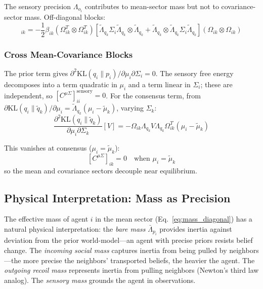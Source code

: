 \documentclass[11pt]{article}
\begin{document}
The sensory precision $\Lambda_{o_i}$ contributes to mean-sector mass but not to covariance-sector mass. Off-diagonal blocks:
\begin{equation}
[M_{\Sigma\Sigma}]_{ik} = -\frac{1}{2}\beta_{ik}(\Omega_{ik}^T \otimes \Omega_{ik}^T)\left[\tilde{\Lambda}_{q_k}\Sigma_i\tilde{\Lambda}_{q_k} \otimes \tilde{\Lambda}_{q_k} + \tilde{\Lambda}_{q_k} \otimes \tilde{\Lambda}_{q_k}\Sigma_i\tilde{\Lambda}_{q_k}\right](\Omega_{ik} \otimes \Omega_{ik})
\end{equation}

\subsubsection{Cross Mean-Covariance Blocks}

The prior term gives $\partial^2 \mathrm{KL}(q_i \| p_i)/\partial \mu_i \partial \Sigma_i = 0$. The sensory free energy decomposes into a term quadratic in $\mu_i$ and a term linear in $\Sigma_i$; these are independent, so $[C^{\mu\Sigma}]_{ii}^{\text{sensory}} = 0$. For the consensus term, from $\partial \mathrm{KL}(q_i \| \tilde{q}_k)/\partial \mu_i = \tilde{\Lambda}_{q_k}(\mu_i - \tilde{\mu}_k)$, varying $\Sigma_k$:
\begin{equation}
\frac{\partial^2 \mathrm{KL}(q_i \| \tilde{q}_k)}{\partial \mu_i \partial \Sigma_k}[V] = -\Omega_{ik}\Lambda_{q_k} V \Lambda_{q_k} \Omega_{ik}^T (\mu_i - \tilde{\mu}_k)
\end{equation}

This vanishes at consensus ($\mu_i = \tilde{\mu}_k$):
\begin{equation}
\boxed{[C^{\mu\Sigma}]_{ik} = 0 \quad \text{when } \mu_i = \tilde{\mu}_k}
\end{equation}
so the mean and covariance sectors decouple near equilibrium.

\subsection{Physical Interpretation: Mass as Precision}

The effective mass of agent $i$ in the mean sector (Eq.~\ref{eq:mass_diagonal}) has a natural physical interpretation: the \emph{bare mass} $\bar{\Lambda}_{p_i}$ provides inertia against deviation from the prior world-model---an agent with precise priors resists belief change. The \emph{incoming social mass} captures inertia from being pulled by neighbors---the more precise the neighbors' transported beliefs, the heavier the agent. The \emph{outgoing recoil mass} represents inertia from pulling neighbors (Newton's third law analog). The \emph{sensory mass} grounds the agent in observations.
\end{document}
